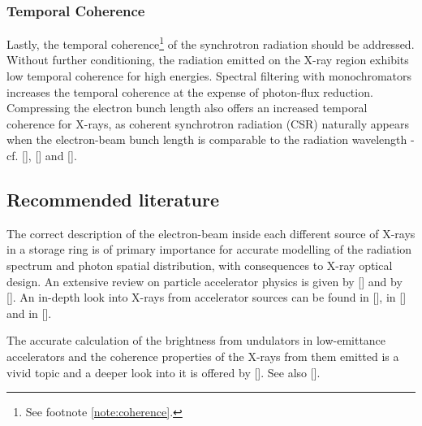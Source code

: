 \begin{refsection}
\subsubsection*{Temporal Coherence}

Lastly, the temporal coherence\footnote{See footnote \ref{note:coherence}.} of the synchrotron radiation should be addressed. Without further conditioning, the radiation emitted on the X-ray region exhibits low temporal coherence for high energies. Spectral filtering with monochromators increases the temporal coherence at the expense of photon-flux reduction. Compressing the electron bunch length also offers an increased temporal coherence for X-rays, as coherent synchrotron radiation (CSR) naturally appears when the electron-beam bunch length is comparable to the radiation wavelength - cf. [\cite{Chubar2006}], [\cite[\textit{§3.8} \& \textit{§13}]{Talman2006}] and [\cite[\textit{§21.7}]{Wiedemann2015}]. 

\subsection*{Recommended literature}

The correct description of the electron-beam inside each different source of X-rays in a storage ring is of primary importance for accurate modelling of the radiation spectrum and photon spatial distribution, with consequences to X-ray optical design.
An extensive review on particle accelerator physics is given by [\cite{Duke2000}] and by [\cite{Wiedemann2015}]. An in-depth look into X-rays from accelerator sources can be found in [\cite{Clarke2004}], in [\cite{Talman2006}] and in [\cite{Elleaume2013}].

The accurate calculation of the brightness from undulators in low-emittance accelerators and the coherence properties of the X-rays from them emitted is a vivid topic and a deeper look into it is offered by [\cite{Bazarov2012, Tanaka2014, Geloni2015, Geloni2008, Walker2019, Khubbutdinov2019}]. See also [\cite{Singer2014}].


\end{refsection}
